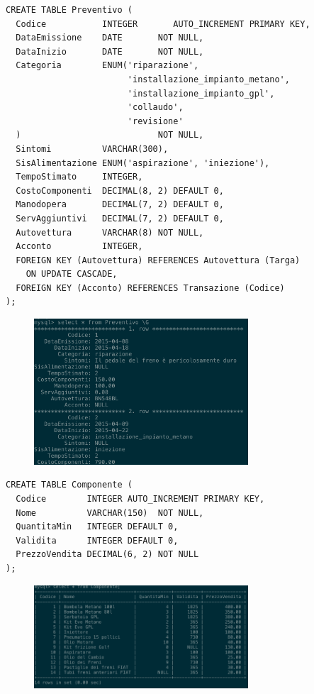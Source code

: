     \begin{lstlisting}
CREATE TABLE Preventivo (
  Codice           INTEGER       AUTO_INCREMENT PRIMARY KEY,
  DataEmissione    DATE       NOT NULL,
  DataInizio       DATE       NOT NULL,
  Categoria        ENUM('riparazione',
                        'installazione_impianto_metano',
                        'installazione_impianto_gpl',
                        'collaudo',
                        'revisione'
  )                           NOT NULL,
  Sintomi          VARCHAR(300),
  SisAlimentazione ENUM('aspirazione', 'iniezione'),
  TempoStimato     INTEGER,
  CostoComponenti  DECIMAL(8, 2) DEFAULT 0,
  Manodopera       DECIMAL(7, 2) DEFAULT 0,
  ServAggiuntivi   DECIMAL(7, 2) DEFAULT 0,
  Autovettura      VARCHAR(8) NOT NULL,
  Acconto          INTEGER,
  FOREIGN KEY (Autovettura) REFERENCES Autovettura (Targa)
    ON UPDATE CASCADE,
  FOREIGN KEY (Acconto) REFERENCES Transazione (Codice)
);
    \end{lstlisting}
    \begin{figure}[H]
      \centering
      \includegraphics[width=8cm]{images/screenshots/schema/preventivo.png}
    \end{figure}

    \begin{lstlisting}
CREATE TABLE Componente (
  Codice        INTEGER AUTO_INCREMENT PRIMARY KEY,
  Nome          VARCHAR(150)  NOT NULL,
  QuantitaMin   INTEGER DEFAULT 0,
  Validita      INTEGER DEFAULT 0,
  PrezzoVendita DECIMAL(6, 2) NOT NULL
);
    \end{lstlisting}
    \begin{figure}[H]
      \centering
      \includegraphics[width=8cm]{images/screenshots/schema/componente.png}
    \end{figure}

